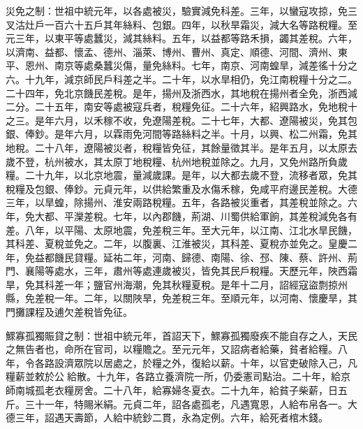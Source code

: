 \begin{pinyinscope}
 災免之制：世祖中統元年，以各處被災，驗實減免科差。三年，以蠻寇攻掠，免三叉沽灶戶一百六十五戶其年絲料、包銀。四年，以秋旱霜災，減大名等路稅糧。至元三年，以東平等處蠶災，減其絲料。五年，以益都等路禾損，蠲其差稅。六年，以濟南、益都、懷孟、德州、淄萊、博州、曹州、真定、順德、河間、濟州、東平、恩州、南京等處桑蠶災傷，量免絲料。七年，南京、河南蝗旱，減差徭十分之六。十九年，減京師民戶科差之半。二十年，以水旱相仍，免江南稅糧十分之二。二十四年，免北京饑民差稅。是年，揚州及浙西水，其地稅在揚州者全免，浙西減二分。二十五年，南安等處被寇兵者，稅糧免征。二十六年，紹興路水，免地稅十之三。是年六月，以禾稼不收，免遼陽差稅。二十七年，大都、遼陽被災，免其包銀、俸鈔。是年六月，以霖雨免河間等路絲料之半。十月，以興、松二州霜，免其地稅。二十八年，遼陽被災者，稅糧皆免征，其餘量徵其半。是年五月，以太原去歲不登，杭州被水，其太原丁地稅糧、杭州地稅並除之。九月，又免州路所負歲糧。二十九年，以北京地震，量減歲課。是年，以大都去歲不登，流移者眾，免其稅糧及包銀、俸鈔。元貞元年，以供給繁重及水傷禾稼，免咸平府邊民差稅。大德三年，以旱蝗，除揚州、淮安兩路稅糧。五年，各路被災重者，其差稅並除之。六年，免大都、平灤差稅。七年，以內郡饑，荊湖、川蜀供給軍餉，其差稅減免各有差。八年，以平陽、太原地震，免差稅三年。至大元年，以江南、江北水旱民饑，其科差、夏稅並免之。二年，以腹裏、江淮被災，其科差、夏稅亦並免之。皇慶二年，免益都饑民貸糧。延祐二年，河南、歸德、南陽、徐、邳、陳、蔡、許州、荊門、襄陽等處水，三年，肅州等處連歲被災，皆免其民戶稅糧。天歷元年，陜西霜旱，免其科差一年；鹽官州海潮，免其秋糧夏稅。是年十二月，詔經寇盜剽掠州縣，免差稅一年。二年，以關陜旱，免差稅三年。至順元年，以河南、懷慶旱，其門攤課程及逋欠差稅皆免征。



 鰥寡孤獨賑貸之制：世祖中統元年，首詔天下，鰥寡孤獨廢疾不能自存之人，天民之無告者也，命所在官司，以糧贍之。至元元年，又詔病者給藥，貧者給糧。八年，令各路設濟眾院以居處之，於糧之外，復給以薪。十年，以官吏破除入己，凡糧薪並敕於公給散。十九年，各路立養濟院一所，仍委憲司點治。二十年，給京師南城孤老衣糧房舍。二十八年，給寡婦冬夏衣。二十九年，給貧子柴薪，日五斤。三十一年，特賜米絹。元貞二年，詔各處孤老，凡遇寬恩，人給布帛各一。大德三年，詔遇天壽節，人給中統鈔二貫，永為定例。六年，給死者棺木錢。




\end{pinyinscope}
